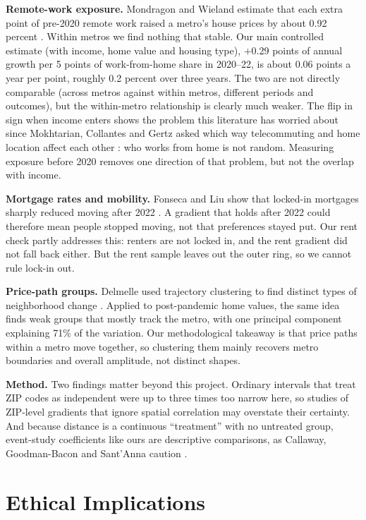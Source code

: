 \documentclass[11pt]{article}
\begin{document}
\textbf{Remote-work exposure.} Mondragon and Wieland estimate that each extra point of pre-2020 remote work raised a metro's house prices
by about 0.92 percent \cite{mondragon}. Within metros we find nothing that stable. Our main controlled estimate (with income, home value and housing type), $+$0.29 points of
annual growth per 5 points of work-from-home share in 2020--22, is about 0.06 points a year per point, roughly 0.2 percent over three years.
The two are not directly comparable (across metros against within metros, different periods and outcomes), but the within-metro
relationship is clearly much weaker. The flip in sign when income enters shows the problem this literature has worried about since Mokhtarian, Collantes and
Gertz asked which way telecommuting and home location affect each other \cite{mokhtarian}: who works from home is not random. Measuring exposure before 2020
removes one direction of that problem, but not the overlap with income.

\textbf{Mortgage rates and mobility.} Fonseca and Liu show that locked-in mortgages sharply reduced moving after 2022 \cite{fonseca}. A
gradient that holds after 2022 could therefore mean people stopped moving, not that preferences stayed put. Our rent check partly
addresses this: renters are not locked in, and the rent gradient did not fall back either. But the rent sample leaves out the outer ring,
so we cannot rule lock-in out.

\textbf{Price-path groups.} Delmelle used trajectory clustering to find distinct types of neighborhood change \cite{delmelle}. Applied
to post-pandemic home values, the same idea finds weak groups that mostly track the metro, with one principal component explaining 71\%
of the variation. Our methodological takeaway is that price paths within a metro move together, so clustering them mainly recovers
metro boundaries and overall amplitude, not distinct shapes.

\textbf{Method.} Two findings matter beyond this project. Ordinary intervals that treat ZIP codes as independent were up to three times
too narrow here, so studies of ZIP-level gradients that ignore spatial correlation may overstate their certainty. And because distance is
a continuous ``treatment'' with no untreated group, event-study coefficients like ours are descriptive comparisons, as Callaway,
Goodman-Bacon and Sant'Anna caution \cite{callaway}.

\section{Ethical Implications}
\end{document}
